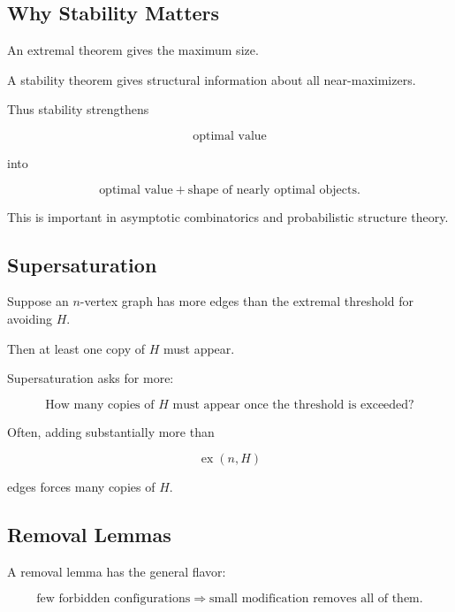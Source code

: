 \subsection{Why Stability Matters}
\label{subsec:why-stability-matters}

An extremal theorem gives the maximum size.

A stability theorem gives structural information about all
near-maximizers.

Thus stability strengthens

\[
\boxed{
\text{optimal value}
}
\]

into

\[
\boxed{
\text{optimal value}
+
\text{shape of nearly optimal objects}.
}
\]

This is important in asymptotic combinatorics and probabilistic
structure theory.

\subsection{Supersaturation}
\label{subsec:supersaturation}

Suppose an \(n\)-vertex graph has more edges than the extremal threshold
for avoiding \(H\).

Then at least one copy of \(H\) must appear.

Supersaturation asks for more:

\[
\boxed{
\text{How many copies of }H\text{ must appear once the threshold is
exceeded?}
}
\]

Often, adding substantially more than

\[
\operatorname{ex}(n,H)
\]

edges forces many copies of \(H\).

\subsection{Removal Lemmas}
\label{subsec:removal-lemmas-preview}

A removal lemma has the general flavor:

\[
\boxed{
\text{few forbidden configurations}
\Longrightarrow
\text{small modification removes all of them}.
}
\]

